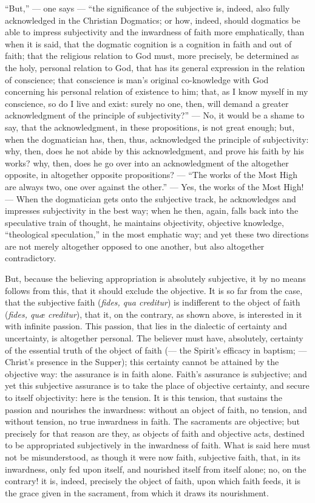 \documentclass[12pt]{book}
\begin{document}
``But,'' --- one says --- ``the significance of the subjective is, indeed, also fully acknowledged in the Christian Dogmatics; or how, indeed, should dogmatics be able to impress subjectivity and the inwardness of faith more emphatically, than when it is said, that the dogmatic cognition is a cognition in faith and out of faith; that the religious relation to God must, more precisely, be determined as the holy, personal relation to God, that has its general expression in the relation of conscience; that conscience is man's original co-knowledge with God concerning his personal relation of existence to him; that, as I know myself in my conscience, so do I live and exist: surely no one, then, will demand a greater acknowledgment of the principle of subjectivity?'' --- No, it would be a shame to say, that the acknowledgment, in these propositions, is not great enough; but, when the dogmatician has, then, thus, acknowledged the principle of subjectivity: why, then, does he not abide by this acknowledgment, and prove his faith by his works? why, then, does he go over into an acknowledgment of the altogether opposite, in altogether opposite propositions? --- ``The works of the Most High are always two, one over against the other.'' --- Yes, the works of the Most
High! --- When the dogmatician gets onto the subjective track, he acknowledges and impresses subjectivity in the best way; when he then, again, falls back into the speculative train of thought, he maintains objectivity, objective knowledge, ``theological speculation,'' in the most emphatic way; and yet these two directions are not merely altogether opposed to one another, but also altogether contradictory.

But, because the believing appropriation is absolutely subjective, it by no means follows from this, that it should exclude the objective. It is so far from the case, that the subjective faith (\textit{fides, qua creditur}) is indifferent to the object of faith (\textit{fides, quæ creditur}), that it, on the contrary, as shown above, is interested in it with infinite passion. This passion, that lies in the dialectic of certainty and uncertainty, is altogether personal. The believer must have, absolutely, certainty of the essential truth of the object of faith (--- the Spirit's efficacy in baptism; --- Christ's presence in the Supper); this certainty cannot be attained by the objective way: the assurance is in faith alone. Faith's assurance is subjective; and yet this subjective assurance is to take the place of objective certainty, and secure to itself objectivity: here is the tension. It is this tension, that sustains the passion and nourishes the inwardness: without an object of faith, no tension, and without tension, no true inwardness in faith. The sacraments are objective; but precisely for that reason are they, as objects of faith and objective
acts, destined to be appropriated subjectively in the inwardness of faith. What is said here must not be misunderstood, as though it were now faith, subjective faith, that, in its inwardness, only fed upon itself, and nourished itself from itself alone; no, on the contrary! it is, indeed, precisely the object of faith, upon which faith feeds, it is the grace given in the sacrament, from which it draws its nourishment.
\end{document}
